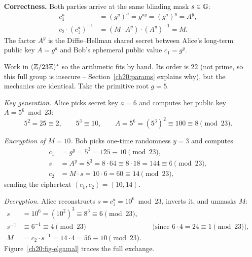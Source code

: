 \begin{whybox}
\textbf{Correctness.} Both parties arrive at the same blinding mask $s \in \mathbb{G}$:
\begin{align*}
  c_1^{a} &= (g^{y})^{a} = g^{ay} = (g^{a})^{y} = A^{y}, \\
  c_2 \cdot (c_1^a)^{-1} &= (M \cdot A^y) \cdot (A^y)^{-1} = M.
\end{align*}
The factor $A^y$ is the Diffie--Hellman shared secret between Alice's long-term public key $A=g^a$ and Bob's ephemeral public value
$c_1 = g^y$.
\end{whybox}

\begin{example}[ElGamal by hand, $p = 23$]
\label{ch20:ex-elgamal}
Work in $(\mathbb{Z}/23\mathbb{Z})^{*}$ so the arithmetic fits by hand. Its order is $22$ (not prime, so this full group is insecure -- Section~\ref{ch20:params} explains why), but the mechanics are identical. Take the primitive root $g = 5$.

\emph{Key generation.} Alice picks secret key $a = 6$ and computes her public key $A = 5^6 \bmod 23$:
\[
  5^2 = 25 \equiv 2,\qquad 5^3 \equiv 10,\qquad A = 5^6 = (5^3)^2 \equiv 100 \equiv 8 \pmod{23}.
\]

\emph{Encryption of $M = 10$.} Bob picks one-time randomness $y = 3$ and computes
\begin{align*}
  c_1 &= g^{y} = 5^{3} = 125 \equiv 10 \pmod{23}, \\
  s &= A^{y} = 8^{3} = 8 \cdot 64 \equiv 8 \cdot 18 = 144 \equiv 6 \pmod{23}, \\
  c_2 &= M \cdot s = 10 \cdot 6 = 60 \equiv 14 \pmod{23},
\end{align*}
sending the ciphertext $(c_1, c_2) = (10, 14)$.

\emph{Decryption.} Alice reconstructs $s = c_1^a = 10^6 \bmod 23$, inverts it, and unmasks $M$:
\begin{align*}
  s &= 10^6 = (10^2)^3 \equiv 8^3 \equiv 6 \pmod{23}, \\
  s^{-1} &\equiv 6^{-1} \equiv 4 \pmod{23} && \text{(since $6 \cdot 4 = 24 \equiv 1 \pmod{23}$)}, \\
  M &= c_2 \cdot s^{-1} = 14 \cdot 4 = 56 \equiv 10 \pmod{23}.
\end{align*}
Figure~\ref{ch20:fig-elgamal} traces the full exchange.
\end{example}

